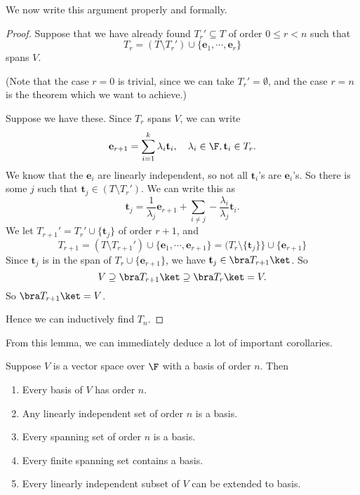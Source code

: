 \documentclass[a4paper]{article}
\begin{document}
We now write this argument properly and formally.
\begin{proof}
  Suppose that we have already found $T_r'\subseteq T$ of order $0 \leq r < n$ such that
  \[
    T_r = (T\setminus T_r') \cup \{\mathbf{e}_1, \cdots, \mathbf{e}_r\}
  \]
  spans $V$.

  (Note that the case $r = 0$ is trivial, since we can take $T_r' = \emptyset$, and the case $r = n$ is the theorem which we want to achieve.)

  Suppose we have these. Since $T_r$ spans $V$, we can write
  \[
    \mathbf{e}_{r + 1} = \sum_{i = 1}^k \lambda_i \mathbf{t}_i,\quad \lambda_i \in \F, \mathbf{t}_i \in T_r.
  \]
  We know that the $\mathbf{e}_i$ are linearly independent, so not all $\mathbf{t}_i$'s are $\mathbf{e}_i$'s. So there is some $j$ such that $\mathbf{t}_j \in (T\setminus T_r')$. We can write this as
  \[
    \mathbf{t}_j = \frac{1}{\lambda_j} \mathbf{e}_{r + 1} + \sum_{i \not= j} -\frac{\lambda_i}{\lambda_j} \mathbf{t}_i.
  \]
  We let $T_{r + 1}' = T_r' \cup \{\mathbf{t}_j\}$ of order $r + 1$, and
  \[
    T_{r + 1} = (T\setminus T_{r + 1}') \cup \{\mathbf{e}_1, \cdots, \mathbf{e}_{r + 1}\} = (T_r \setminus \{\mathbf{t}_j\}\} \cup \{\mathbf{e}_{r + 1}\}
  \]
  Since $\mathbf{t}_j$ is in the span of $T_r\cup \{\mathbf{e}_{r + 1}\}$, we have $\mathbf{t}_j \in \bra T_{r + 1}\ket$. So
  \[
    V \supseteq \bra T_{r + 1}\ket \supseteq \bra T_r \ket = V.
  \]
  So $\bra T_{r + 1}\ket = V$.

  Hence we can inductively find $T_n$.
\end{proof}

From this lemma, we can immediately deduce a lot of important corollaries.
\begin{cor}
  Suppose $V$ is a vector space over $\F$ with a basis of order $n$. Then
  \begin{enumerate}
    \item Every basis of $V$ has order $n$.
    \item Any linearly independent set of order $n$ is a basis.
    \item Every spanning set of order $n$ is a basis.
    \item Every finite spanning set contains a basis.
    \item Every linearly independent subset of $V$ can be extended to basis.
  \end{enumerate}
\end{cor}
\end{document}
